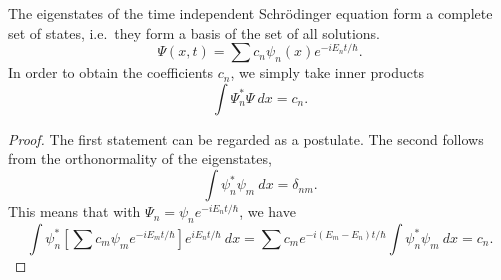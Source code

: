 \documentclass[11pt]{article}
\theoremstyle{definition}
\theoremstyle{remark}
\numberwithin{equation}{section}
\begin{document}
    \begin{theorem}
        The eigenstates of the time independent Schr\"odinger equation form a
        complete set of states, i.e.\ they form a basis of the set of all
        solutions. \[
            \Psi(x, t) = \sum c_n \psi_n(x) e^{-i E_n t/\hbar}.
        \] In order to obtain the coefficients $c_n$, we simply take inner products
        \[
            \int \Psi_n^*\Psi\:dx = c_n.
        \] 
    \end{theorem}
    \begin{proof}
        The first statement can be regarded as a postulate. The second follows from
        the orthonormality of the eigenstates, \[
            \int \psi_n^*\psi_m\:dx = \delta_{nm}.
        \] This means that with $\Psi_n = \psi_n e^{-iE_n t / \hbar}$, we have \[
            \int \psi_n^* \left[\sum c_m\psi_m e^{-i E_m t /\hbar}\right]e^{i E_n t
            / \hbar}\:dx = 
            \sum c_me^{-i (E_m - E_n) t / \hbar}\int \psi_n^*\psi_m\:dx = c_n.
        \] 
    \end{proof}
\end{document}

